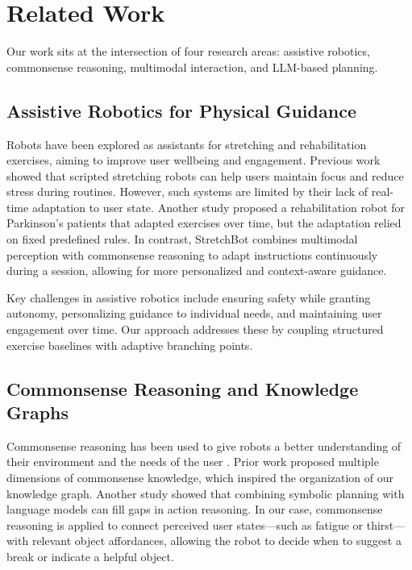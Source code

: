 \section{Related Work}
\label{sec:related}

Our work sits at the intersection of four research areas: assistive robotics, commonsense reasoning, multimodal interaction, and LLM-based planning.

\subsection{Assistive Robotics for Physical Guidance}

Robots have been explored as assistants for stretching and rehabilitation exercises, aiming to improve user wellbeing and engagement. Previous work \cite{ref6} showed that scripted stretching robots can help users maintain focus and reduce stress during routines. However, such systems are limited by their lack of real-time adaptation to user state. Another study \cite{ref7} proposed a rehabilitation robot for Parkinson's patients that adapted exercises over time, but the adaptation relied on fixed predefined rules. In contrast, StretchBot combines multimodal perception with commonsense reasoning to adapt instructions continuously during a session, allowing for more personalized and context-aware guidance.

Key challenges in assistive robotics include ensuring safety while granting autonomy, personalizing guidance to individual needs, and maintaining user engagement over time. Our approach addresses these by coupling structured exercise baselines with adaptive branching points.

\subsection{Commonsense Reasoning and Knowledge Graphs}

Commonsense reasoning has been used to give robots a better understanding of their environment and the needs of the user \cite{ref8}. Prior work \cite{ref8} proposed multiple dimensions of commonsense knowledge, which inspired the organization of our knowledge graph. Another study \cite{ref9} showed that combining symbolic planning with language models can fill gaps in action reasoning. In our case, commonsense reasoning is applied to connect perceived user states—such as fatigue or thirst—with relevant object affordances, allowing the robot to decide when to suggest a break or indicate a helpful object.

